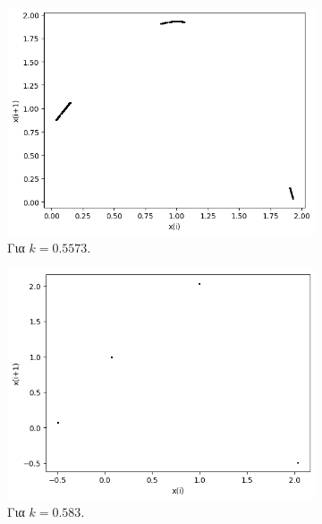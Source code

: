 \begin{figure}[h!]
\begin{subfigure}[b]{0.4\textwidth}
		\includegraphics[width=\textwidth]{LateX images/graphs q03/g11}
		\caption{Για $k=0.5573$.}
		\label{f:k23}
	\end{subfigure}
	\hfill
	\begin{subfigure}[b]{0.4\textwidth}
		\centering
		\includegraphics[width=\textwidth]{LateX images/graphs q03/g12}
		\caption{Για $k=0.583$.}
		\label{f:k24}
	\end{subfigure}
	\hfill
	\begin{subfigure}[b]{0.4\textwidth}
		\centering

\end{subfigure}
\end{figure}

